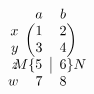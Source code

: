 \documentclass{article}
\begin{document}
\[
  \begin{blockarray}{rcc}
    & a & b \\
    \begin{block}{r(cc)}
      x & 1 & 2 \\
      y & 3 & 4 \\
    \end{block}
    \begin{block}{r\Left{$M$}{\{}c|c\Right{\}}{$N$}}
      z & 5 & 6 \\
    \end{block}
    w & 7 & 8 \\
  \end{blockarray}
\]
\end{document}
